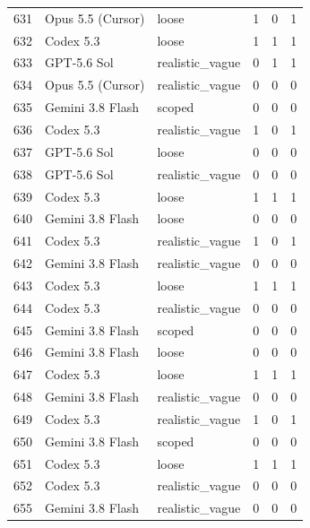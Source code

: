\begin{tabular}{llllll}
631 & Opus 5.5 (Cursor) & loose & 1 & 0 & 1 \\
632 & Codex 5.3 & loose & 1 & 1 & 1 \\
633 & GPT-5.6 Sol & realistic\_vague & 0 & 1 & 1 \\
634 & Opus 5.5 (Cursor) & realistic\_vague & 0 & 0 & 0 \\
635 & Gemini 3.8 Flash & scoped & 0 & 0 & 0 \\
636 & Codex 5.3 & realistic\_vague & 1 & 0 & 1 \\
637 & GPT-5.6 Sol & loose & 0 & 0 & 0 \\
638 & GPT-5.6 Sol & realistic\_vague & 0 & 0 & 0 \\
639 & Codex 5.3 & loose & 1 & 1 & 1 \\
640 & Gemini 3.8 Flash & loose & 0 & 0 & 0 \\
641 & Codex 5.3 & realistic\_vague & 1 & 0 & 1 \\
642 & Gemini 3.8 Flash & realistic\_vague & 0 & 0 & 0 \\
643 & Codex 5.3 & loose & 1 & 1 & 1 \\
644 & Codex 5.3 & realistic\_vague & 0 & 0 & 0 \\
645 & Gemini 3.8 Flash & scoped & 0 & 0 & 0 \\
646 & Gemini 3.8 Flash & loose & 0 & 0 & 0 \\
647 & Codex 5.3 & loose & 1 & 1 & 1 \\
648 & Gemini 3.8 Flash & realistic\_vague & 0 & 0 & 0 \\
649 & Codex 5.3 & realistic\_vague & 1 & 0 & 1 \\
650 & Gemini 3.8 Flash & scoped & 0 & 0 & 0 \\
651 & Codex 5.3 & loose & 1 & 1 & 1 \\
652 & Codex 5.3 & realistic\_vague & 0 & 0 & 0 \\
655 & Gemini 3.8 Flash & realistic\_vague & 0 & 0 & 0 \\
\bottomrule
\end{tabular}
